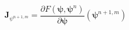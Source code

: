 \begin{equation}
\label{eq:richards-newton-deriv-setup}
\mathbf{J}_{\psi^{n+1,m}}  = {\frac {\partial F(\boldsymbol{\psi},\boldsymbol{\psi}^n)}{\partial \boldsymbol{\psi}}}\left(\boldsymbol{\psi}^{n+1,m} \right)
\end{equation}
